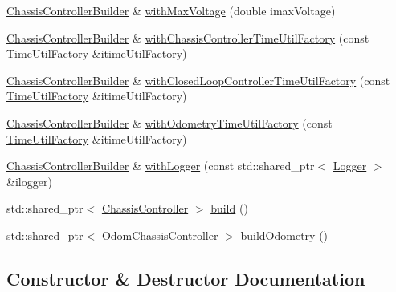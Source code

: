 \begin{DoxyCompactItemize}
\mbox{\hyperlink{classokapi_1_1ChassisControllerBuilder}{Chassis\+Controller\+Builder}} \& \mbox{\hyperlink{classokapi_1_1ChassisControllerBuilder_a7bf0a781b124ae39c8fc46786d18243a}{with\+Max\+Voltage}} (double imax\+Voltage)
\item 
\mbox{\hyperlink{classokapi_1_1ChassisControllerBuilder}{Chassis\+Controller\+Builder}} \& \mbox{\hyperlink{classokapi_1_1ChassisControllerBuilder_a1ca2919cbd6fa19b34aeaa1eeee98462}{with\+Chassis\+Controller\+Time\+Util\+Factory}} (const \mbox{\hyperlink{classokapi_1_1TimeUtilFactory}{Time\+Util\+Factory}} \&itime\+Util\+Factory)
\item 
\mbox{\hyperlink{classokapi_1_1ChassisControllerBuilder}{Chassis\+Controller\+Builder}} \& \mbox{\hyperlink{classokapi_1_1ChassisControllerBuilder_a5bf13424f9357099d6e4d336cc0cec98}{with\+Closed\+Loop\+Controller\+Time\+Util\+Factory}} (const \mbox{\hyperlink{classokapi_1_1TimeUtilFactory}{Time\+Util\+Factory}} \&itime\+Util\+Factory)
\item 
\mbox{\hyperlink{classokapi_1_1ChassisControllerBuilder}{Chassis\+Controller\+Builder}} \& \mbox{\hyperlink{classokapi_1_1ChassisControllerBuilder_ab601ad0881616b9af271d19c820ca3f2}{with\+Odometry\+Time\+Util\+Factory}} (const \mbox{\hyperlink{classokapi_1_1TimeUtilFactory}{Time\+Util\+Factory}} \&itime\+Util\+Factory)
\item 
\mbox{\hyperlink{classokapi_1_1ChassisControllerBuilder}{Chassis\+Controller\+Builder}} \& \mbox{\hyperlink{classokapi_1_1ChassisControllerBuilder_ac2ba4b3f5a3b08e611ea21e0d9406250}{with\+Logger}} (const std\+::shared\+\_\+ptr$<$ \mbox{\hyperlink{classokapi_1_1Logger}{Logger}} $>$ \&ilogger)
\item 
std\+::shared\+\_\+ptr$<$ \mbox{\hyperlink{classokapi_1_1ChassisController}{Chassis\+Controller}} $>$ \mbox{\hyperlink{classokapi_1_1ChassisControllerBuilder_a5dfd1f4d60a3c4bfcc28a57211c1a6a2}{build}} ()
\item 
std\+::shared\+\_\+ptr$<$ \mbox{\hyperlink{classokapi_1_1OdomChassisController}{Odom\+Chassis\+Controller}} $>$ \mbox{\hyperlink{classokapi_1_1ChassisControllerBuilder_a9c631ea817466483aa2cfcb886f6d892}{build\+Odometry}} ()
\end{DoxyCompactItemize}


\subsection{Constructor \& Destructor Documentation}
\mbox{\label{classokapi_1_1ChassisControllerBuilder_a47e82afd7b6f3e3076d153e6130820ed}} 
